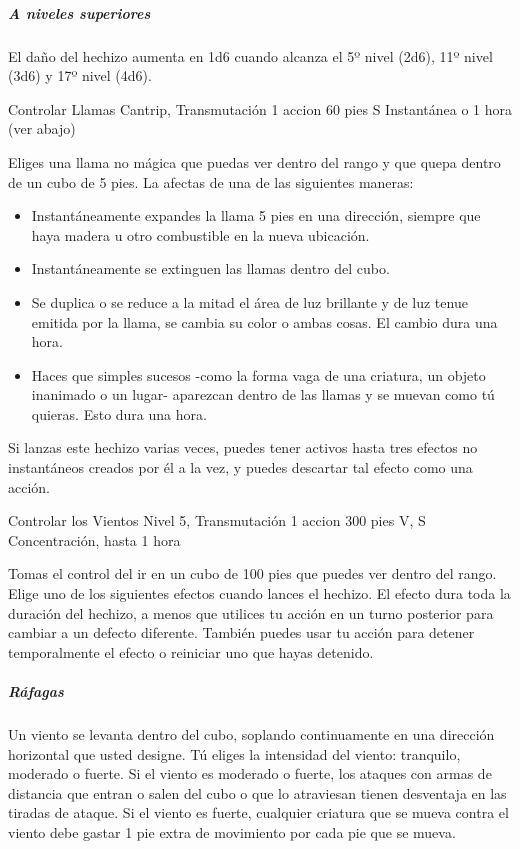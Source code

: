 \documentclass[a4paper,twocolumn,openany,10pt]{dndbook}
\begin{document}
	\subparagraph{A niveles superiores} El daño del hechizo aumenta en 1d6 cuando alcanza el 5º nivel (2d6), 11º nivel (3d6) y
	17º nivel (4d6). 

\spellheader%
	{Controlar Llamas}
	{Cantrip, Transmutación}
	{1 accion}
	{60 pies}
	{S}
	{Instantánea o 1 hora (ver abajo)}
	
	Eliges una llama no mágica que puedas ver dentro del rango y que quepa dentro de un cubo de 5 pies. La afectas de una de las
	siguientes maneras:

	\begin{itemize}
		\item Instantáneamente expandes la llama 5 pies en una dirección, siempre que haya madera u otro combustible en la nueva
		ubicación.
		
		\item Instantáneamente se extinguen las llamas dentro del cubo.
		
		\item Se duplica o se reduce a la mitad el área de luz brillante y de luz tenue emitida por la llama, se cambia su color
		o ambas cosas. El cambio dura una hora.
		
		\item Haces que simples sucesos -como la forma vaga de una criatura, un objeto inanimado o un lugar- aparezcan dentro de
		las llamas y se muevan como tú quieras. Esto dura una hora.
	\end{itemize}
	
	Si lanzas este hechizo varias veces, puedes tener activos hasta tres efectos no instantáneos creados por él a la vez, y
	puedes descartar tal efecto como una acción. 

\spellheader%
	{Controlar los Vientos}
	{Nivel 5, Transmutación}
	{1 accion}
	{300 pies}
	{V, S}
	{Concentración, hasta 1 hora}
	
	Tomas el control del ir en un cubo de 100 pies que puedes ver dentro del rango. Elige uno de los siguientes efectos cuando
	lances el hechizo. El efecto dura toda la duración del hechizo, a menos que utilices tu acción en un turno posterior para
	cambiar a un defecto diferente. También puedes usar tu acción para detener temporalmente el efecto o reiniciar uno que hayas
	detenido.

	\subparagraph{Ráfagas} Un viento se levanta dentro del cubo, soplando continuamente en una dirección horizontal que usted
	designe. Tú eliges la intensidad del viento: tranquilo, moderado o fuerte. Si el viento es moderado o fuerte, los ataques
	con armas de distancia que entran o salen del cubo o que lo atraviesan tienen desventaja en las tiradas de ataque. Si el
	viento es fuerte, cualquier criatura que se mueva contra el viento debe gastar 1 pie extra de movimiento por cada pie que se
	mueva.
\end{document}
